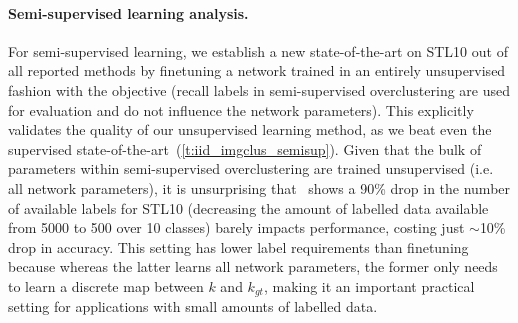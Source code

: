\paragraph{Semi-supervised learning analysis.}
For semi-supervised learning, we establish a new state-of-the-art on STL10 out of all reported methods by finetuning a network trained in an entirely unsupervised fashion with the \methodnameshort objective (recall labels in semi-supervised overclustering are used for evaluation and do not influence the network parameters). This explicitly validates the quality of our unsupervised learning method, as we beat even the supervised state-of-the-art~(\cref{t:iid_imgclus_semisup}). Given that the bulk of parameters within semi-supervised overclustering are trained
unsupervised (i.e. all network parameters), it is unsurprising that~ shows a 90\% drop in the number of available labels for STL10 (decreasing the amount of labelled data available from 5000 to 500 over 10 classes) barely impacts performance, costing just $\sim$10\% drop in accuracy. This setting has lower label requirements than finetuning because whereas the latter learns all network parameters, the former only needs to learn a discrete map between $k$ and $k_{gt}$, making it an important practical setting for applications with small amounts of labelled data.


